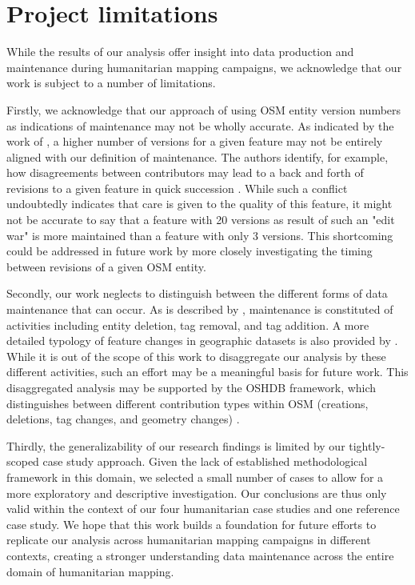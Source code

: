 \section{Project limitations}

While the results of our analysis offer insight into data production and maintenance during humanitarian mapping campaigns, we acknowledge that our work is subject to a number of limitations. 

Firstly, we acknowledge that our approach of using OSM entity version numbers as indications of maintenance may not be wholly accurate. As indicated by the work of \textcite{mooney_characteristics_2012}, a higher number of versions for a given feature may not be entirely aligned with our definition of maintenance. The authors identify, for example, how disagreements between contributors may lead to a back and forth of revisions to a given feature in quick succession \textcite{mooney_characteristics_2012}. While such a conflict undoubtedly indicates that care is given to the quality of this  feature, it might not be accurate to say that a feature with 20 versions as result of such an "edit war" is more maintained than a feature with only 3 versions. This shortcoming could be addressed in future work by more closely investigating the timing between revisions of a given OSM entity. 

Secondly, our work neglects to distinguish between the different forms of data maintenance that can occur. As is described by \textcite{quattrone_work_2017}, maintenance is constituted of activities including entity deletion, tag removal, and tag addition. A more detailed typology of feature changes in geographic datasets is also provided by \textcite{rehrl_towards_2015}. While it is out of the scope of this work to disaggregate our analysis by these different activities, such an effort may be a meaningful basis for future work. This disaggregated analysis may be supported by the OSHDB framework, which distinguishes between different contribution types within OSM (creations, deletions, tag changes, and geometry changes) \parencite{heidelberg_institute_for_geoinformation_technology_oshdb_2020}. 

Thirdly, the generalizability of our research findings is limited by our tightly-scoped case study approach. Given the lack of established methodological framework in this domain, we selected a small number of cases to allow for a more exploratory and descriptive investigation. Our conclusions are thus only valid within the context of our four humanitarian case studies and one reference case study. We hope that this work builds a foundation for future efforts to replicate our analysis across humanitarian mapping campaigns in different contexts, creating a stronger understanding data maintenance across the entire domain of humanitarian mapping. 



